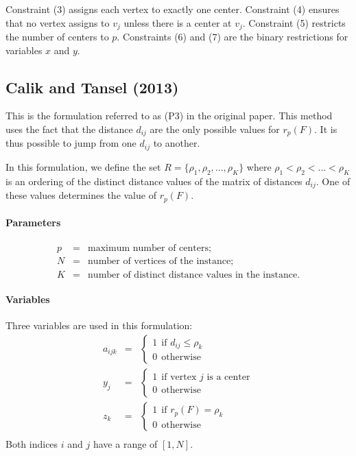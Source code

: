 \documentclass[a4paper,10pt]{article}
\begin{document}
	Constraint (3) assigns each vertex to exactly one center.
	Constraint (4) ensures that no vertex assigns to $v_j$ unless there is a center at $v_j$. 
	Constraint (5) restricts the number of centers to $p$.
	Constraints (6) and (7) are the binary restrictions for variables $x$ and $y$.     
    
    \subsection{Calik and Tansel (2013)}
	This is the formulation referred to as (P3) in the original paper. This method uses the fact that the distance $d_{ij}$ are the only possible values for $r_p(F)$. It is thus possible to jump from one $d_{ij}$ to another.
	
	In this formulation, we define the set $ R = \{ \rho_1, \rho_2, ..., \rho_K \}$ where $\rho_1 < \rho_2 < ... < \rho_K$ is an ordering of the distinct distance values of the matrix of distances $d_{ij}$. One of these values determines the value of $r_p(F)$.
	
	\paragraph{Parameters} 
	\begin{eqnarray*}
		p &=& \text{maximum number of centers;} \\
		N &=& \text{number of vertices of the instance;} \\
		K &=& \text{number of distinct distance values in the instance.}
	\end{eqnarray*}
	
	\paragraph{Variables} Three variables are used in this formulation:
	\begin{eqnarray*}
		a_{ijk} &=& \begin{cases}
 				1 ~~\text{if $d_{ij} \leq \rho_k$} \\
 				0 ~~\text{otherwise}
 			\end{cases} \\
		y_j &=& \begin{cases}
 				1 ~~\text{if vertex $j$ is a center} \\
 				0 ~~\text{otherwise}
 			\end{cases} \\
 		z_{k} &=& \begin{cases}
 				1 ~~\text{if $r_p(F) = \rho_k$} \\
 				0 ~~\text{otherwise}
 			\end{cases} \\
	\end{eqnarray*}
	Both indices $i$ and $j$ have a range of $[1, N]$.
	
\end{document}
